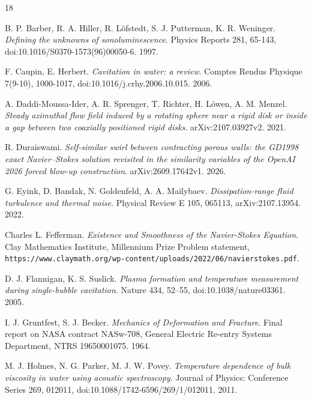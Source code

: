\backmatter
{}
\begin{thebibliography}{18}

B. P. Barber, R. A. Hiller, R. L\"ofstedt, S. J. Putterman, K. R. Weninger. \emph{Defining the unknowns of sonoluminescence}. Physics Reports 281, 65-143, doi:10.1016/S0370-1573(96)00050-6. 1997.

F. Caupin, E. Herbert. \emph{Cavitation in water: a review}. Comptes Rendus Physique 7(9-10), 1000-1017, doi:10.1016/j.crhy.2006.10.015. 2006.

A. Daddi-Moussa-Ider, A. R. Sprenger, T. Richter, H. L\"owen, A. M. Menzel. \emph{Steady azimuthal flow field induced by a rotating sphere near a rigid disk or inside a gap between two coaxially positioned rigid disks}. arXiv:2107.03927v2. 2021.

R. Duraiswami. \emph{Self-similar swirl between contracting porous walls: the GD1998 exact Navier--Stokes solution revisited in the similarity variables of the OpenAI 2026 forced blow-up construction}. arXiv:2609.17642v1. 2026.

G. Eyink, D. Bandak, N. Goldenfeld, A. A. Mailybaev. \emph{Dissipation-range fluid turbulence and thermal noise}. Physical Review E 105, 065113, arXiv:2107.13954. 2022.

Charles L. Fefferman. \emph{Existence and Smoothness of the Navier-Stokes Equation}. Clay Mathematics Institute, Millennium Prize Problem statement, \texttt{https:/\allowbreak{}/\allowbreak{}www.claymath.org/\allowbreak{}wp-content/\allowbreak{}uploads/\allowbreak{}2022/\allowbreak{}06/\allowbreak{}navierstokes.pdf}.

D. J. Flannigan, K. S. Suslick. \emph{Plasma formation and temperature measurement during single-bubble cavitation}. Nature 434, 52--55, doi:10.1038/nature03361. 2005.

I. J. Gruntfest, S. J. Becker. \emph{Mechanics of Deformation and Fracture}. Final report on NASA contract NASw-708, General Electric Re-entry Systems Department, NTRS 19650001075. 1964.

M. J. Holmes, N. G. Parker, M. J. W. Povey. \emph{Temperature dependence of bulk viscosity in water using acoustic spectroscopy}. Journal of Physics: Conference Series 269, 012011, doi:10.1088/1742-6596/269/1/012011. 2011.


\end{thebibliography}
